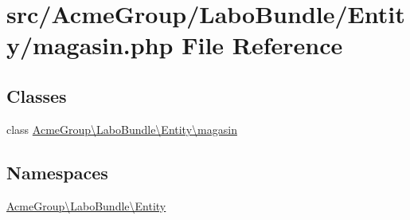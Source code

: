 \hypertarget{_labo_bundle_2_entity_2magasin_8php}{\section{src/\+Acme\+Group/\+Labo\+Bundle/\+Entity/magasin.php File Reference}
\label{_labo_bundle_2_entity_2magasin_8php}
}
\subsection*{Classes}
\begin{DoxyCompactItemize}
\item 
class \hyperlink{class_acme_group_1_1_labo_bundle_1_1_entity_1_1magasin}{Acme\+Group\textbackslash{}\+Labo\+Bundle\textbackslash{}\+Entity\textbackslash{}magasin}
\end{DoxyCompactItemize}
\subsection*{Namespaces}
\begin{DoxyCompactItemize}
\item 
 \hyperlink{namespace_acme_group_1_1_labo_bundle_1_1_entity}{Acme\+Group\textbackslash{}\+Labo\+Bundle\textbackslash{}\+Entity}
\end{DoxyCompactItemize}
